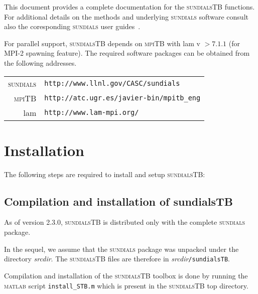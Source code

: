 \documentclass[titlepage,10pt]{article}
\newcommand{\sundialsTB}{{\normalfont\scshape sundialsTB}}
\newcommand{\sundials}{{\normalfont\scshape sundials}}
\newcommand{\matlab}{{\normalfont\scshape matlab}}
\newcommand{\mpiTB}{{\normalfont\scshape mpiTB}}
\begin{document}
This document provides a complete documentation for the {\sundialsTB} functions.
For additional details on the methods and underlying {\sundials} software consult
also the coresponding {\sundials} user guides~\cite{cvodes_ug,idas_ug,kinsol_ug}.

\vspace{0.15in}
For parallel support, {\sundialsTB} depends on {\mpiTB} with {\sc lam} v $> 7.1.1$ (for MPI-2 spawning feature).
The required software packages can be obtained from the following addresses.
%
\begin{center}
\begin{tabular}{rl}
{\sundials} & {\tt http://www.llnl.gov/CASC/sundials} \\
{\mpiTB}    & {\tt http://atc.ugr.es/javier-bin/mpitb\_eng}\\
{\sc lam}   & {\tt http://www.lam-mpi.org/}
\end{tabular}
\end{center}

\section{Installation} 

The following steps are required to install and setup {\sundialsTB}:

\subsection{Compilation and installation of sundialsTB}

As of version 2.3.0, {\sundialsTB} is distributed only with the complete {\sundials} package.

In the sequel, we assume that the {\sundials} package was unpacked under the directory {\em srcdir}.
The {\sundialsTB} files are therefore in {\em srcdir}{\tt /sundialsTB}. 

Compilation and installation of the {\sundialsTB} toolbox is done by running the {\matlab} script 
{\tt install\_STB.m} which is present in the {\sundialsTB} top directory.
\end{document}
